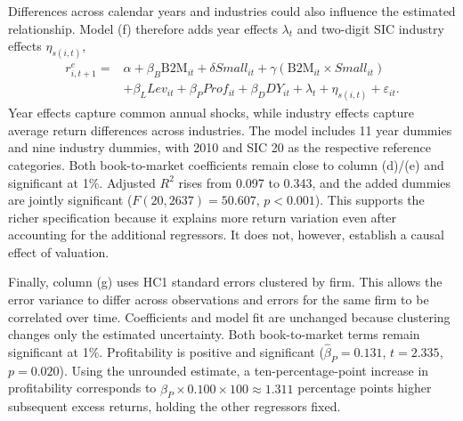 \newpage
Differences across calendar years and industries could also influence the estimated relationship. Model (f) therefore adds year effects $\lambda_t$ and two-digit SIC industry effects $\eta_{s(i,t)}$,
\begin{equation}
\begin{aligned}
r^e_{i,t+1}={}&\alpha+\beta_B \mathrm{B2M}_{it}+\delta Small_{it}
+\gamma(\mathrm{B2M}_{it}\times Small_{it})\\
&+\beta_L Lev_{it}+\beta_P Prof_{it}+\beta_D DY_{it}
+\lambda_t+\eta_{s(i,t)}+\varepsilon_{it}.
\end{aligned}
\label{eq:dummies}
\end{equation}
Year effects capture common annual shocks, while industry effects capture average return differences across industries. The model includes 11 year dummies and nine industry dummies, with 2010 and SIC 20 as the respective reference categories. Both book-to-market coefficients remain close to column (d)/(e) and significant at 1\%. Adjusted $R^2$ rises from 0.097 to 0.343, and the added dummies are jointly significant ($F(20,2637)=50.607$, $p<0.001$). This supports the richer specification because it explains more return variation even after accounting for the additional regressors. It does not, however, establish a causal effect of valuation.

Finally, column (g) uses HC1 standard errors clustered by firm. This allows the error variance to differ across observations and errors for the same firm to be correlated over time. Coefficients and model fit are unchanged because clustering changes only the estimated uncertainty. Both book-to-market terms remain significant at 1\%. Profitability is positive and significant ($\hat\beta_P=0.131$, $t=2.335$, $p=0.020$). Using the unrounded estimate, a ten-percentage-point increase in profitability corresponds to $\hat\beta_P\times0.100\times100\approx1.311$ percentage points higher subsequent excess returns, holding the other regressors fixed.
